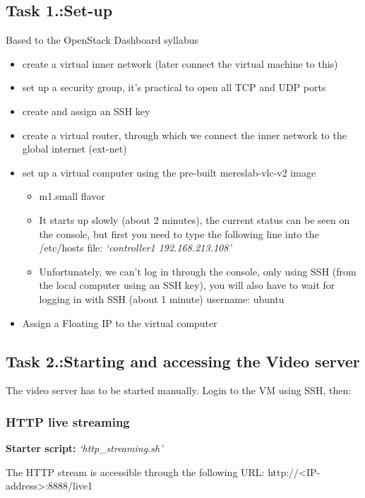 \documentclass[a4paper]{article}
\begin{document}
\subsection{Task 1.:Set-up}

Based to the OpenStack Dashboard syllabus
\begin{itemize}
\item create a virtual inner network (later connect the virtual machine to this)
\item set up a security group, it's practical to open all TCP and UDP ports
\item create and assign an SSH key
\item create a virtual router, through which we connect the inner network to the global internet (ext-net)
\item set up a virtual computer using the pre-built mereslab-vlc-v2 image
\begin{itemize}
\item m1.small flavor
\item It starts up slowly (about 2 minutes), the current status can be seen on the console, but first you need to type the following line into the /etc/hosts file:
         \emph{`controller1 192.168.213.108'}
\item Unfortunately, we can't log in through the console, only using SSH (from the local computer using an SSH key),
               you will also have to wait for logging in with SSH (about 1 minute)  
       username: ubuntu
\end{itemize}
\item Assign a Floating IP to the virtual computer
\end{itemize}

\subsection{Task 2.:Starting and accessing the Video server}

The video server has to be started manually. Login to the VM using SSH, then:

\subsubsection{HTTP live streaming}
\textbf{Starter script:} \emph{`http\_streaming.sh'}

\noindent{}The HTTP stream is accessible through the following URL: http://{}\textless{}IP-address{}\textgreater{}:8888/live1 
\end{document}
